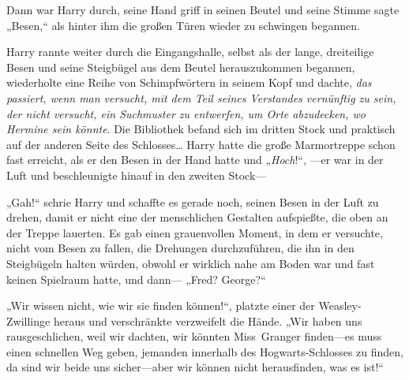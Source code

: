 Dann war Harry durch, seine Hand griff in seinen Beutel und seine Stimme sagte „Besen,“ als hinter ihm die großen Türen wieder zu schwingen begannen.

Harry rannte weiter durch die Eingangshalle, selbst als der lange, dreiteilige Besen und seine Steigbügel aus dem Beutel herauszukommen begannen, wiederholte eine Reihe von Schimpfwörtern in seinem Kopf und dachte, \emph{das passiert, wenn man versucht, mit dem Teil seines Verstandes vernünftig zu sein, der nicht versucht, ein Suchmuster zu entwerfen, um Orte abzudecken, wo Hermine sein könnte}. Die Bibliothek befand sich im dritten Stock und praktisch auf der anderen Seite des Schlosses… Harry hatte die große Marmortreppe schon fast erreicht, als er den Besen in der Hand hatte und „\emph{Hoch}!“, —er war in der Luft und beschleunigte hinauf in den zweiten Stock—

„Gah!“ schrie Harry und schaffte es gerade noch, seinen Besen in der Luft zu drehen, damit er nicht eine der menschlichen Gestalten aufspießte, die oben an der Treppe lauerten. Es gab einen grauenvollen Moment, in dem er versuchte, nicht vom Besen zu fallen, die Drehungen durchzuführen, die ihn in den Steigbügeln halten würden, obwohl er wirklich nahe am Boden war und fast keinen Spielraum hatte, und dann— „Fred? George?“

„Wir wissen nicht, wie wir sie finden können!“, platzte einer der Weasley-Zwillinge heraus und verschränkte verzweifelt die Hände. „Wir haben uns rausgeschlichen, weil wir dachten, wir könnten Miss~Granger finden—es muss einen schnellen Weg geben, jemanden innerhalb des Hogwarts-Schlosses zu finden, da sind wir beide uns sicher—aber wir können nicht herausfinden, was es ist!“

